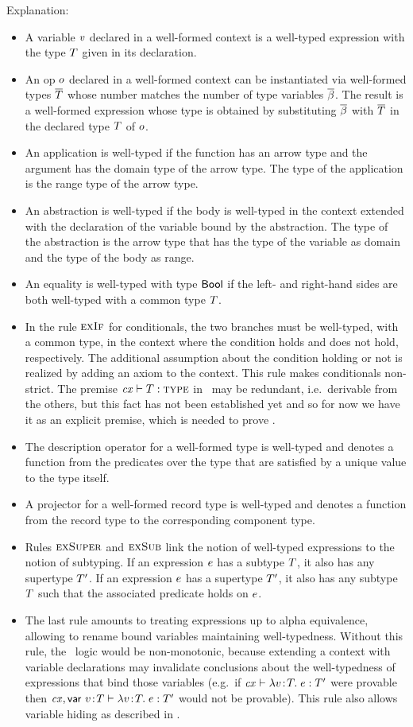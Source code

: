 Explanation:
\begin{itemize}
\item
A variable $v$ declared in a well-formed context is a well-typed expression
with the type $T$ given in its declaration.
\item
An op $o$ declared in a well-formed context can be instantiated via
well-formed types $\overline{T}$ whose number matches the number of type variables
$\overline{\beta}$. The result is a well-formed expression whose type is obtained by
substituting $\overline{\beta}$ with $\overline{T}$ in the declared type $T$ of $o$.
\item
An application is well-typed if the function has an arrow type and the
argument has the domain type of the arrow type. The type of the application is
the range type of the arrow type.
\item
An abstraction is well-typed if the body is well-typed in the context extended
with the declaration of the variable bound by the abstraction. The type of the
abstraction is the arrow type that has the type of the variable as domain and
the type of the body as range.
\item
An equality is well-typed with type $\mathsf{Bool}$ if the left- and right-hand sides
are both well-typed with a common type $T$.
\item
In the rule $\textsc{exIf}$ for conditionals, the two branches must be well-typed,
with a common type, in the context where the condition holds and does not
hold, respectively. The additional assumption about the condition holding or
not is realized by adding an axiom to the context. This rule makes
conditionals non-strict. The premise $\mathit{cx}\vdash T:\textsc{type}$ in \Reif\ may be
redundant, i.e.\ derivable from the others, but this fact has not been
established yet and so for now we have it as an explicit premise, which is
needed to prove .
\item
The description operator for a well-formed type is well-typed and denotes a
function from the predicates over the type that are satisfied by a unique
value to the type itself.
\item
A projector for a well-formed record type is well-typed and denotes a function
from the record type to the corresponding component type.
\item
Rules $\textsc{exSuper}$ and $\textsc{exSub}$ link the notion of well-typed expressions to the
notion of subtyping. If an expression $e$ has a subtype $T$, it also
has any supertype $T'$. If an expression $e$ has a supertype $T'$,
it also has any subtype $T$ such that the associated predicate holds on
$e$.
\item
The last rule amounts to treating expressions up to alpha equivalence,
allowing to rename bound variables maintaining well-typedness. Without this
rule, the \MS\ logic would be non-monotonic, because extending a context with
variable declarations may invalidate conclusions about the well-typedness of
expressions that bind those variables (e.g.\ if $\mathit{cx}\vdash\lambda v\!:\!T.\;e:T'$ were
provable then $\mathit{cx},\mathsf{var}\ v\!:\!T\vdash\lambda v\!:\!T.\;e:T'$ would not be
provable). This rule also allows variable hiding as described in \cite{lm}.
\end{itemize}

